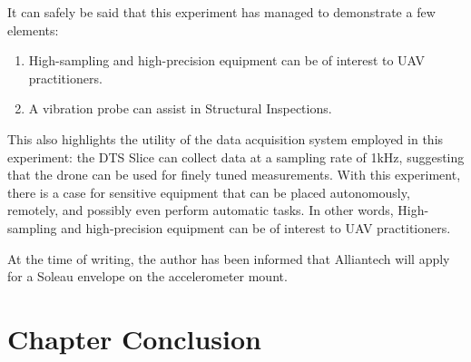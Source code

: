 
It can safely be said that this experiment has managed to demonstrate a few elements:

\begin{enumerate}
    \item High-sampling and high-precision equipment can be of interest to UAV practitioners. 
    \item A vibration probe can assist in Structural Inspections.
\end{enumerate}

This also highlights the utility of the data acquisition system employed in this experiment: the DTS Slice can collect data at a sampling rate of 1kHz, suggesting that the drone can be used for finely tuned measurements. With this experiment, there is a case for sensitive equipment that can be placed autonomously, remotely, and possibly even perform automatic tasks. In other words, High-sampling and high-precision equipment can be of interest to UAV practitioners.

At the time of writing, the author has been informed that Alliantech will apply for a Soleau envelope on the accelerometer mount. 

 



\section{Chapter Conclusion}






